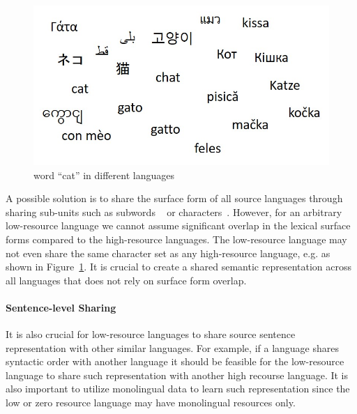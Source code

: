  \begin{figure}[hptb]
 	\centering
 	\includegraphics[width=0.85\linewidth]{figs/ulr/cat.jpg}
     \caption{\label{cp5.fig.cat}word ``cat'' in different languages}
 \end{figure}

A possible solution is to share the surface form of  all source languages through sharing sub-units such as subwords ~\cite{sennrich2015neural} or characters~\cite{kim2016character,luong2016achieving,lee2016fully}.  %
However, for an arbitrary low-resource language we cannot assume significant overlap in the lexical surface forms compared to the high-resource languages. The low-resource language may not even share the same character set as any high-resource language, e.g. as shown in Figure~\ref{cp5.fig.cat}. It is crucial to create a shared semantic representation across all languages that does not rely on surface form overlap.



\paragraph{Sentence-level Sharing} It is also crucial for low-resource languages to share source sentence representation with other similar languages. For example, if a language shares  syntactic order with another language it should be feasible for the low-resource language to share such representation with another high recourse language. It is also important to utilize monolingual data to learn such representation since the low or zero resource language may  have monolingual resources only.


